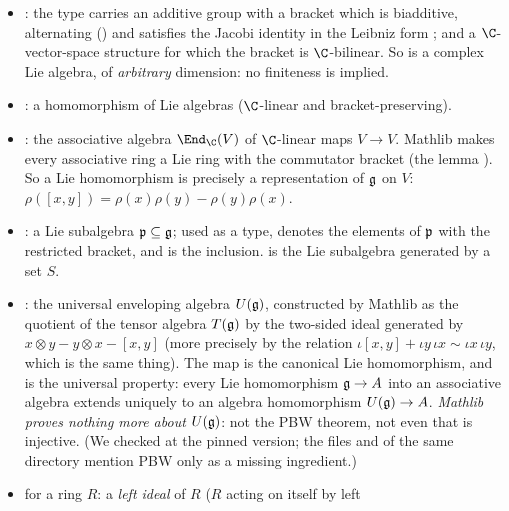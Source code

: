 \begin{itemize}
\item \lean{[LieRing 𝔤] [LieAlgebra ℂ 𝔤]}: the type  carries an additive group with a
  bracket  which is biadditive, alternating () and satisfies the
  Jacobi identity in the Leibniz form ; and a
  $\C$-vector-space structure for which the bracket is $\C$-bilinear. So  is a complex Lie
  algebra, of \emph{arbitrary} dimension: no finiteness is implied.
\item {}: a homomorphism of Lie algebras ($\C$-linear and bracket-preserving).
\item {}: the associative algebra $\End_\C(V)$ of $\C$-linear maps $V\to V$.
  Mathlib makes every associative ring a Lie ring with the commutator bracket
   (the lemma \allowbreak{}\allowbreak{}\allowbreak{}\allowbreak{}). So a Lie
  homomorphism  is precisely a representation of $\mathfrak{g}$ on $V$:
  $\rho([x,y]) = \rho(x)\rho(y)-\rho(y)\rho(x)$.
\item {}: a Lie subalgebra $\mathfrak{p}\subseteq\mathfrak{g}$; used as a type, 
  denotes the elements of $\mathfrak{p}$ with the restricted bracket, and  is the inclusion.
   is the Lie subalgebra generated by a set $S$.
\item {}: the universal enveloping algebra $U(\mathfrak{g})$,
  constructed by Mathlib as the quotient of the tensor algebra $T(\mathfrak{g})$ by the two-sided ideal
  generated by $x\otimes y - y\otimes x - [x,y]$ (more precisely by the relation
  $\iota[x,y] + \iota y\,\iota x \sim \iota x\,\iota y$, which is the same thing). The map
   is the canonical Lie homomorphism, and
   is the universal property: every Lie homomorphism $\mathfrak{g}\to A$ into an associative
  algebra extends uniquely to an algebra homomorphism $U(\mathfrak{g})\to A$. \emph{Mathlib proves
  nothing more about $U(\mathfrak{g})$}: not the PBW theorem, not even that  is injective. (We
  checked  at the pinned
  version; the files  and  of the same directory
  mention PBW only as a missing ingredient.)
\item {} for a ring $R$: a \emph{left ideal} of $R$ ($R$ acting on itself by left

\end{itemize}
